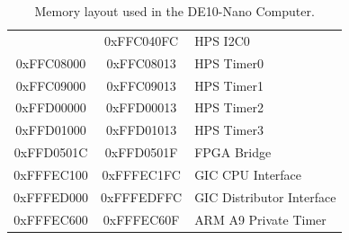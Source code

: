\documentclass[11pt, twoside, pdftex]{article}
\newcommand{\commonFiles}{../../../common/doc}
\newcommand{\templatePath}{../../../common/templates}
\begin{document}
\begin{table}[h]
\begin{center}
\begin{tabular}{c|c|l}
            & 0xFFC040FC
            & HPS I2C0
        \\
            0xFFC08000
            & 0xFFC08013
            & HPS Timer0
        \\
            0xFFC09000
            & 0xFFC09013
            & HPS Timer1
        \\
            0xFFD00000
            & 0xFFD00013
            & HPS Timer2
        \\
            0xFFD01000
            & 0xFFD01013
            & HPS Timer3
        \\
            0xFFD0501C
            & 0xFFD0501F
            & FPGA Bridge
        \\
            0xFFFEC100
            & 0xFFFEC1FC
            & GIC CPU Interface
        \\
            0xFFFED000
            & 0xFFFEDFFC
            & GIC Distributor Interface
        \\
            0xFFFEC600
            & 0xFFFEC60F
            & ARM A9 Private Timer
        \\
    \end{tabular}
    \caption{Memory layout used in the DE10-Nano Computer.}
    \label{tab:memorylayout}
    \end{center}
\end{table}



\clearpage








 
\end{document}
